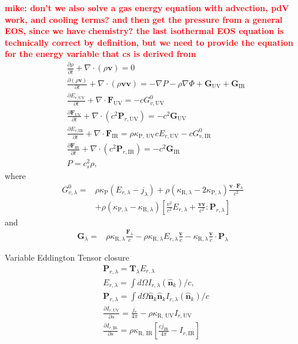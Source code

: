\documentclass[twocolumn,linenumbers]{aastex631}
\begin{document}
\textcolor{red}{\bf mike: don't we also solve a gas energy equation with advection, pdV work, and cooling terms? and then get the pressure from a general EOS, since we have chemistry? the last isothermal EOS equation is technically correct by definition, but we need to provide the equation for the energy variable that cs is derived from}
\begin{align}
& \frac{\partial \rho}{\partial t} + \nabla \cdot (\rho \mathbf{v}) = 0 \\
& \frac{\partial (\rho \mathbf{v})}{\partial t} + \nabla \cdot (\rho \mathbf{vv}) = -\nabla P - \rho \nabla \Phi + \mathbf{G}_{\text{UV}} + \mathbf{G}_{\text{IR}} \\
& \frac{\partial E_{r, \text{UV}}}{\partial t} + \nabla \cdot \mathbf{F}_{\text{UV}} = - cG^0_{v, \text{UV}} \\
& \frac{\partial \mathbf{F}_{\text{UV}}}{\partial t} + \nabla \cdot (c^2 \mathbf{P}_{r, \text{UV}}) = -c^2 \mathbf{G}_{\text{UV}} \\
& \frac{\partial E_{r, \text{IR}}}{\partial t} + \nabla \cdot \mathbf{F}_{\text{IR}} = \rho \kappa_{\text{P, UV}} c E_{r, \text{UV}} - cG^0_{v, \text{IR}} \\
& \frac{\partial \mathbf{F}_{\text{IR}}}{\partial t} + \nabla \cdot (c^2 \mathbf{P}_{r, \text{IR}}) = -c^2 \mathbf{G}_{\text{IR}} \\
& P = c_s^2 \rho,
\end{align}
where
\begin{align}
G_{v, \lambda}^0 = & \rho \kappa_{\text{P}} (E_{r, \lambda} - j_\lambda) + \rho (\kappa_{\text{R}, \lambda} - 2\kappa_{\text{P}, \lambda}) \frac{\mathbf{v} \cdot \mathbf{F}_\lambda}{c^2} \\
& + \rho (\kappa_{\text{P}, \lambda} - \kappa_{\text{R}, \lambda}) \left[ \frac{v^2}{c^2} E_{r, \lambda} + \frac{\mathbf{vv}}{c^2} : \mathbf{P}_{r, \lambda} \right]
\end{align}
and
\begin{align}
    \mathbf{G}_\lambda = & \rho \kappa_{\mathrm{R}, \lambda} \frac{\mathbf{F}_\lambda}{c} - \rho \kappa_{\mathrm{R}, \lambda} E_{r, \lambda} \frac{\mathbf{v}}{c} - \kappa_{\mathrm{R}, \lambda} \frac{\mathbf{v}}{c} \cdot \mathbf{P}_\lambda
\end{align}

Variable Eddington Tensor closure
\begin{align}
&\mathbf{P}_{r, \lambda} = \mathbf{T}_\lambda E_{r, \lambda}\\
&E_{r, \lambda}  = \int d\Omega I_{r, \lambda}(\mathbf{\hat{n}}_k) / c, \\
&\mathbf{P}_{r, \lambda} = \int d\Omega \mathbf{\hat{n}}_k \mathbf{\hat{n}}_k I_{r, \lambda}(\mathbf{\hat{n}}_k) / c\\
&\frac{\partial I_{r, \text{UV}}}{\partial s}  = \frac{j_*}{4\pi} - \rho \kappa_{\text{R, UV}} I_{r, \text{UV}} \\
&\frac{\partial I_{r, \text{IR}}}{\partial s}  = \rho \kappa_{\text{R, IR}} \left[ \frac{c j_{\text{IR}}}{4\pi} - I_{r, \text{IR}} \right]
\end{align}
\end{document}
